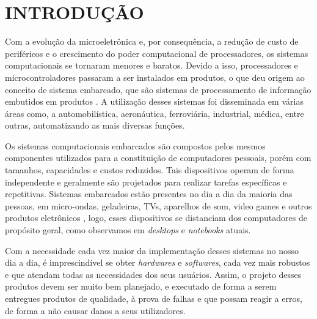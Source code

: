 
\chapter{INTRODUÇÃO}
\label{chap:introducao}
Com a evolução da microeletrônica e, por consequência, a redução de custo de periféricos e o crescimento do poder computacional de processadores, os sistemas computacionais se tornaram menores e baratos. Devido a isso, processadores e microcontroladores passaram a ser instalados em produtos, o que deu origem ao conceito de sistema embarcado, que são sistemas de processamento de informação embutidos em produtos \cite{Marwedel2006}.
A utilização desses sistemas foi disseminada em várias áreas como, a automobilística, aeronáutica, ferroviária, industrial, médica, entre outras, automatizando as mais diversas funções. 



Os sistemas computacionais embarcados são compostos pelos mesmos componentes utilizados para a constituição de computadores pessoais, porém com tamanhos, capacidades e custos reduzidos. Tais dispositivos operam de forma independente e geralmente são projetados para realizar tarefas específicas e repetitivas. 
Sistemas embarcados estão presentes no dia a dia da maioria das pessoas, em micro-ondas, geladeiras, TVs, aparelhos de som, video games e outros produtos eletrônicos \cite{Marwedel2006}, logo, esses dispositivos se distanciam dos computadores de propósito geral, como observamos em \textit{desktops} e \textit{notebooks} atuais. 




Com a necessidade cada vez maior da implementação desses sistemas no nosso dia a dia, é imprescindível se obter \textit{hardwares} e \textit{softwares}, cada vez mais robustos e que atendam todas as necessidades dos seus usuários.
Assim, o projeto desses produtos devem ser muito bem planejado, e executado de forma a serem entregues produtos de qualidade, à  prova de falhas e que possam reagir a erros, de forma a não causar danos a seus utilizadores. 

